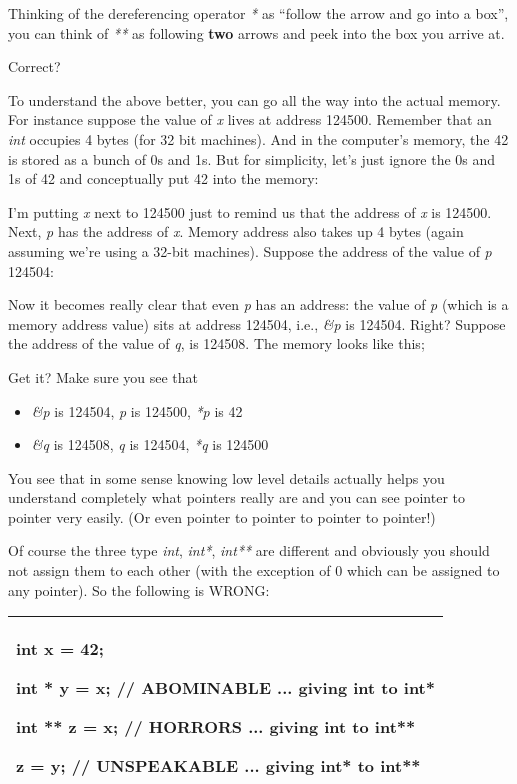 \documentclass[
]{article}
\providecommand{\tightlist}{%
  \setlength{\itemsep}{0pt}\setlength{\parskip}{0pt}}
\begin{document}
Thinking of the dereferencing operator \emph{*} as ``follow the arrow
and go into a box'', you can think of \emph{**} as following
\textbf{two} arrows and peek into the box you arrive at.

Correct?

To understand the above better, you can go all the way into the actual
memory. For instance suppose the value of \emph{x} lives at address
124500. Remember that an \emph{int} occupies 4 bytes (for 32 bit
machines). And in the computer's memory, the 42 is stored as a bunch of
0s and 1s. But for simplicity, let's just ignore the 0s and 1s of 42 and
conceptually put 42 into the memory:

I'm putting \emph{x} next to 124500 just to remind us that the address
of \emph{x} is 124500. Next, \emph{p} has the address of \emph{x}.
Memory address also takes up 4 bytes (again assuming we're using a
32-bit machines). Suppose the address of the value of \emph{p} 124504:

Now it becomes really clear that even \emph{p} has an address: the value
of \emph{p} (which is a memory address value) sits at address 124504,
i.e., \emph{\&p} is 124504. Right? Suppose the address of the value of
\emph{q}, is 124508. The memory looks like this;

Get it? Make sure you see that

\begin{itemize}
\tightlist
\item
  \emph{\&p} is 124504, \emph{p} is 124500, \emph{*p} is 42
\item
  \emph{\&q} is 124508, \emph{q} is 124504, \emph{*q} is 124500
\end{itemize}

You see that in some sense knowing low level details actually helps you
understand completely what pointers really are and you can see pointer
to pointer very easily. (Or even pointer to pointer to pointer to
pointer!)

Of course the three type \emph{int}, \emph{int*}, \emph{int**} are
different and obviously you should not assign them to each other (with
the exception of 0 which can be assigned to any pointer). So the
following is WRONG:

\begin{longtable}[]{@{}l@{}}
\toprule
\endhead
\begin{minipage}[t]{0.97\columnwidth}\raggedright
int x = 42;

int * y = x; // ABOMINABLE ... giving int to int*

int ** z = x; // HORRORS ... giving int to int**

z = y; // UNSPEAKABLE ... giving int* to int** \strut
\end{minipage}\tabularnewline
\bottomrule
\end{longtable}
\end{document}
